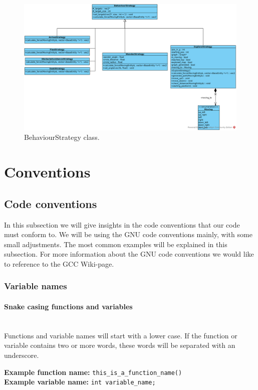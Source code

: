 \begin{figure}[!htb]
\centering
\includegraphics[angle=-90,origin=c,scale=0.6]{res/steering/BehaviourStrategy.png}
\caption{BehaviourStrategy class.}\label{fig:behaviourstrategy}
\end{figure}

\section{Conventions}
\subsection{Code conventions}
In this subsection we will give insights in the code conventions that our code must conform to. We will be using the GNU code conventions mainly, with some small adjustments.
The most common examples will be explained in this subsection. For more information about the GNU code conventions we would like to reference to the GCC Wiki-page. \cite{gccwcc}
\subsubsection{Variable names}
\paragraph{Snake casing functions and variables}
~\\Functions and variable names will start with a lower case. If the function or variable contains two or more words, these words will be separated with an underscore.

\textbf{Example function name:} \lstinline{this_is_a_function_name()}
~\\\textbf{Example variable name:} \lstinline{int variable_name;}

